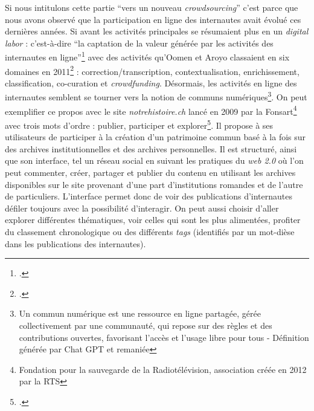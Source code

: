 Si nous intitulons cette partie \enquote{vers un nouveau \textit{crowdsourcing}} c’est parce que nous avons observé que la participation en ligne des internautes avait évolué ces dernières années. Si avant les activités principales se résumaient plus en un \textit{digital labor} : c’est-à-dire \enquote{la captation de la valeur générée par les activités des internautes en ligne}\footcite{zotero-365} avec des activités qu’Oomen et Aroyo classaient en six domaines en 2011\footcite[(cité par)]{neroulidis_crowdsourcing_2015} : correction/transcription, contextualisation, enrichissement, classification, co-curation et \textit{crowdfunding}. Désormais, les activités en ligne des internautes semblent se tourner vers la notion de communs numériques\footnote{Un commun numérique est une ressource en ligne partagée, gérée collectivement par une communauté, qui repose sur des règles et des contributions ouvertes, favorisant l'accès et l'usage libre pour tous - Définition générée par Chat GPT et remaniée}. On peut exemplifier ce propos avec le site \textit{notrehistoire.ch} lancé en 2009 par la Fonsart\footnote{Fondation pour la sauvegarde de la Radiotélévision, association créée en 2012 par la RTS} avec trois mots d’ordre : publier, participer et explorer\footcite{zotero-361}. Il propose à ses utilisateurs de participer à la création d’un patrimoine commun basé à la fois sur des archives institutionnelles et des archives personnelles. Il est structuré, ainsi que son interface, tel un réseau social en suivant les pratiques du \textit{web 2.0} où l’on peut commenter, créer, partager et publier du contenu en utilisant les archives disponibles sur le site provenant d’une part d’institutions romandes et de l’autre de particuliers. L'interface permet donc de voir des publications d’internautes défiler toujours avec la possibilité d’interagir. On peut aussi choisir d’aller explorer différentes thématiques, voir celles qui sont les plus alimentées, profiter du classement chronologique ou des différents \textit{tags} (identifiés par un mot-dièse dans les publications des internautes).



